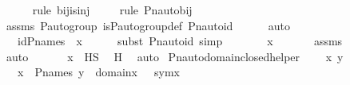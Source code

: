 \begin{isabellebody}
\ \ \ \ \ \isamarkupfalse%
{\isacharparenleft}{\kern0pt}rule\ bij{\isacharunderscore}{\kern0pt}is{\isacharunderscore}{\kern0pt}inj{\isacharparenright}{\kern0pt}\isanewline
\ \ \ \ \isamarkupfalse%
{\isacharparenleft}{\kern0pt}rule\ Pn{\isacharunderscore}{\kern0pt}auto{\isacharunderscore}{\kern0pt}bij{\isacharparenright}{\kern0pt}\isanewline
\ \ \ \ \isamarkupfalse%
\ assms\ {\isasymG}{\isacharunderscore}{\kern0pt}P{\isacharunderscore}{\kern0pt}auto{\isacharunderscore}{\kern0pt}group\ is{\isacharunderscore}{\kern0pt}P{\isacharunderscore}{\kern0pt}auto{\isacharunderscore}{\kern0pt}group{\isacharunderscore}{\kern0pt}def\ Pn{\isacharunderscore}{\kern0pt}auto{\isacharunderscore}{\kern0pt}id\isanewline
\ \ \ \ \isamarkupfalse%
\ auto\isanewline
\ \ \isamarkupfalse%
\ \isamarkupfalse%
\ {\isachardoublequoteopen}{\isachardot}{\kern0pt}{\isachardot}{\kern0pt}{\isachardot}{\kern0pt}\ {\isacharequal}{\kern0pt}\ id{\isacharparenleft}{\kern0pt}P{\isacharunderscore}{\kern0pt}names{\isacharparenright}{\kern0pt}\ {\isacharbackquote}{\kern0pt}\ x{\isachardoublequoteclose}\ \isanewline
\ \ \ \ \isamarkupfalse%
{\isacharparenleft}{\kern0pt}subst\ Pn{\isacharunderscore}{\kern0pt}auto{\isacharunderscore}{\kern0pt}id{\isacharcomma}{\kern0pt}\ simp{\isacharparenright}{\kern0pt}\isanewline
\ \ \isamarkupfalse%
\ \isamarkupfalse%
\ {\isachardoublequoteopen}{\isachardot}{\kern0pt}{\isachardot}{\kern0pt}{\isachardot}{\kern0pt}\ {\isacharequal}{\kern0pt}\ x{\isachardoublequoteclose}\ \isanewline
\ \ \ \ \isamarkupfalse%
\ assms\ \isanewline
\ \ \ \ \isamarkupfalse%
\ auto\ \isanewline
\ \ \isamarkupfalse%
\ \isamarkupfalse%
\ {\isachardoublequoteopen}x\ {\isasymin}\ HS{\isachardoublequoteclose}\ \isamarkupfalse%
\ H\ \isamarkupfalse%
\ auto\isanewline
{}\isamarkupfalse%
%
\endisatagproof
{\isafoldproof}%
%
\isadelimproof
\isanewline
%
\endisadelimproof
\isanewline
{}\isamarkupfalse%
\ Pn{\isacharunderscore}{\kern0pt}auto{\isacharunderscore}{\kern0pt}domain{\isacharunderscore}{\kern0pt}closed{\isacharunderscore}{\kern0pt}helper\ {\isacharcolon}{\kern0pt}\isanewline
\ \ \ x\ y\ {\isasympi}\isanewline
\ \ \ {\isachardoublequoteopen}x\ {\isasymin}\ P{\isacharunderscore}{\kern0pt}names{\isachardoublequoteclose}\ {\isachardoublequoteopen}y\ {\isasymin}\ domain{\isacharparenleft}{\kern0pt}x{\isacharparenright}{\kern0pt}{\isachardoublequoteclose}\ {\isachardoublequoteopen}{\isasympi}\ {\isasymin}\ sym{\isacharparenleft}{\kern0pt}x{\isacharparenright}{\kern0pt}{\isachardoublequoteclose}\ \isanewline

\end{isabellebody}
